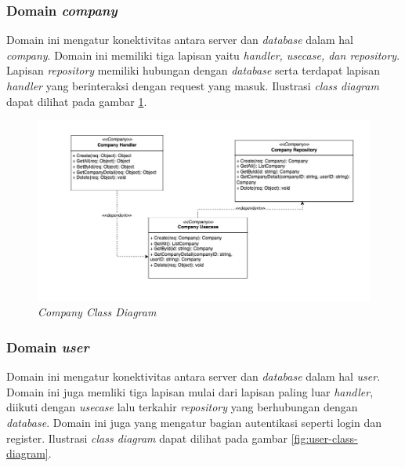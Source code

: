 \pagebreak

\subsubsection{Domain \textit{company}}

Domain ini mengatur konektivitas antara server dan \textit{database} dalam hal \textit{company}. Domain ini memiliki tiga lapisan yaitu \textit{handler, usecase, dan repository}. Lapisan \textit{repository} memiliki hubungan dengan \textit{database} serta terdapat lapisan \textit{handler} yang berinteraksi dengan request yang masuk. Ilustrasi \textit{class diagram} dapat dilihat pada gambar \ref{fig:company-class-diagram}.

\begin{figure}[ht]
  \centering
  \includegraphics[width=1\textwidth]{resources/chapter-3/class/company-class-diagram.jpg}
  \caption{\textit{Company Class Diagram}}
  \label{fig:company-class-diagram}
\end{figure}

\pagebreak

\subsubsection{Domain \textit{user}}

Domain ini mengatur konektivitas antara server dan \textit{database} dalam hal \textit{user}. Domain ini juga memliki tiga lapisan mulai dari lapisan paling luar \textit{handler}, diikuti dengan \textit{usecase} lalu terkahir \textit{repository} yang berhubungan dengan \textit{database}. Domain ini juga yang mengatur bagian autentikasi seperti login dan register. Ilustrasi \textit{class diagram} dapat dilihat pada gambar \ref{fig:user-class-diagram}.

